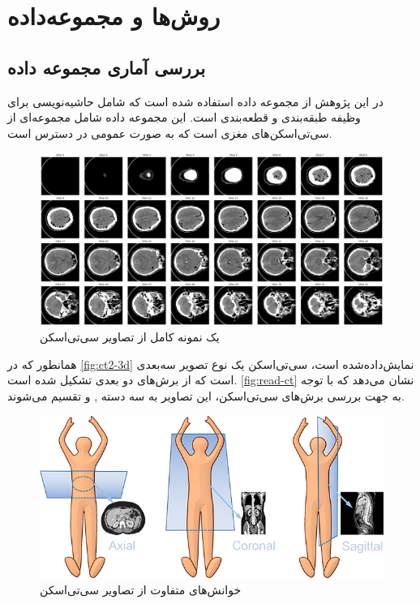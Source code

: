 \chapter{روش‌ها و مجموعه‌داده}
\section{بررسی آماری مجموعه داده}

در این پژوهش از مجموعه داده
\cite{physionet_hssayeni2020intracranial,hssayeni2020computed}
استفاده شده است که شامل حاشیه‌نویسی برای وظیفه طبقه‌بندی و قطعه‌بندی است. این مجموعه داده  شامل مجموعه‌ای از سی‌تی‌اسکن‌های مغزی است که به صورت عمومی در دسترس است.
\begin{figure}[h]
\centering
\includegraphics[width=1.0\linewidth]{Images/Chapter2/3d}
\caption{یک نمونه کامل از تصاویر سی‌تی‌اسکن}
\label{fig:ct2-3d}
\end{figure}


همانطور که در 
\autoref{fig:ct2-3d}
نمایش‌داده‌شده است، سی‌تی‌اسکن یک نوع تصویر سه‌بعدی است که از برش‌های دو بعدی تشکیل شده است. 
\autoref{fig:read-ct}
 نشان می‌دهد که
 با توجه به جهت بررسی برش‌های سی‌تی‌اسکن، این تصاویر به سه دسته 
 ,  و 
 تقسیم می‌شوند.
\begin{figure}[h]
\centering
\includegraphics[width=1.0\linewidth]{"Images/Chapter2/read CT"}
\caption{خوانش‌های متفاوت از تصاویر سی‌تی‌اسکن
\cite{kaggleCTScansDICOM}}
\label{fig:read-ct}
\end{figure}
 

